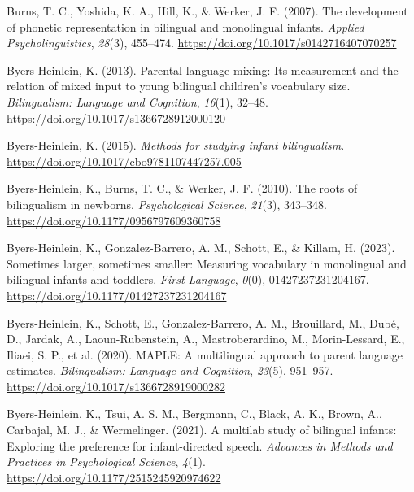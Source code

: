 \documentclass[
  12pt,
  b5paperpaper,
  twoside]{scrreprt}
\newlength{\cslhangindent}
\newlength{\cslentryspacingunit} %
\newenvironment{CSLReferences}[2] %
 {%
  \setlength{\parindent}{0pt}
  \ifodd #1
  \let\oldpar\par
  \def\par{\hangindent=\cslhangindent\oldpar}
  \fi
  \setlength{\parskip}{#2\cslentryspacingunit}
 }%
 {}
\begin{document}
\begin{CSLReferences}{1}{0}
\leavevmode{}%
Burns, T. C., Yoshida, K. A., Hill, K., \& Werker, J. F. (2007). The
development of phonetic representation in bilingual and monolingual
infants. \emph{Applied Psycholinguistics}, \emph{28}(3), 455--474.
\url{https://doi.org/10.1017/s0142716407070257}

\leavevmode{}%
Byers-Heinlein, K. (2013). Parental language mixing: Its measurement and
the relation of mixed input to young bilingual children's vocabulary
size. \emph{Bilingualism: Language and Cognition}, \emph{16}(1), 32--48.
\url{https://doi.org/10.1017/s1366728912000120}

\leavevmode{}%
Byers-Heinlein, K. (2015). \emph{Methods for studying infant
bilingualism}. \url{https://doi.org/10.1017/cbo9781107447257.005}

\leavevmode{}%
Byers-Heinlein, K., Burns, T. C., \& Werker, J. F. (2010). The roots of
bilingualism in newborns. \emph{Psychological Science}, \emph{21}(3),
343--348. \url{https://doi.org/10.1177/0956797609360758}

\leavevmode{}%
Byers-Heinlein, K., Gonzalez-Barrero, A. M., Schott, E., \& Killam, H.
(2023). Sometimes larger, sometimes smaller: Measuring vocabulary in
monolingual and bilingual infants and toddlers. \emph{First Language},
\emph{0}(0), 01427237231204167.
\url{https://doi.org/10.1177/01427237231204167}

\leavevmode{}%
Byers-Heinlein, K., Schott, E., Gonzalez-Barrero, A. M., Brouillard, M.,
Dubé, D., Jardak, A., Laoun-Rubenstein, A., Mastroberardino, M.,
Morin-Lessard, E., Iliaei, S. P., et al. (2020). {MAPLE}: A multilingual
approach to parent language estimates. \emph{Bilingualism: Language and
Cognition}, \emph{23}(5), 951--957.
\url{https://doi.org/10.1017/s1366728919000282}

\leavevmode{}%
Byers-Heinlein, K., Tsui, A. S. M., Bergmann, C., Black, A. K., Brown,
A., Carbajal, M. J., \& Wermelinger. (2021). A multilab study of
bilingual infants: Exploring the preference for infant-directed speech.
\emph{Advances in Methods and Practices in Psychological Science},
\emph{4}(1). \url{https://doi.org/10.1177/2515245920974622}


\end{CSLReferences}
\end{document}
